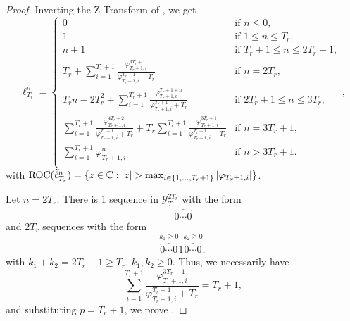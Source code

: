 \documentclass{article}
\begin{document}
  \begin{proof}
    Inverting the Z-Transform of , we get 
    \begin{equation}
      \ell_{T_r}^{n} = 
      \left\{
        \begin{array}{ll}
          0 & \mbox{if } n \leq 0, \\
          1 & \mbox{if } 1 \leq n \leq T_r, \\
          n+1 & \mbox{if } T_r + 1 \leq n \leq 2T_r-1, \\
          T_r + \sum_{i=1}^{T_r + 1} \frac{\varphi_{T_r + 1, i}^{3T_r + 1}}
          {\varphi_{T_r + 1, i}^{T_r + 1} + T_r} & \mbox{if } n = 2T_r, \\
          T_r n - 2T_r ^2 + \sum_{i=1}^{T_r + 1} \frac{\varphi_{T_r + 1, i}^{T_r + 1 + n}}
          {\varphi_{T_r + 1, i}^{T_r + 1} + T_r} & \mbox{if } 2T_r+1 \leq n \leq 3T_r, \\
          \sum_{i=1}^{T_r + 1} \frac{\varphi_{T_r + 1, i}^{4T_r + 2}}
          {\varphi_{T_r + 1, i}^{T_r + 1} + T_r} + T_r \sum_{i=1}^{T_r + 1} \frac{\varphi_{T_r + 1, i}^{3T_r + 1}}
          {\varphi_{T_r + 1, i}^{T_r + 1} + T_r} & \mbox{if } n=3T_r+1, \\
          \sum_{i=1}^{T_r + 1} \varphi_{T_r + 1, i}^n
          & \mbox{if } n > 3T_r + 1. \\
        \end{array}
      \right.,
    \end{equation}
    with $\textnormal{ROC}(\tilde{\ell}_{T_r}^{n}) = \{z \in \mathbb C : |z| > \max_{i \in \{1, \dots, T_r + 1\}} |\varphi_{T_r + 1, i}|\}$.  
  
    Let $n = 2T_r$. There is 1 sequence in $\mathcal{Y}_{T_r}^{2T_r}$ with the form
    \begin{equation*}
      \overbrace{0 \cdots 0}
    \end{equation*} 
    and $2T_r$ sequences with the form
    \begin{equation*}
      \overbrace{0 \cdots 0}^{k_1 \geq 0} 1 \overbrace{0 \cdots 0}^{k_2 \geq 0},
    \end{equation*} 
    with $k_1 + k_2 = 2 T_r - 1 \geq T_r$, $k_1, k_2 \geq 0$.
    Thus, we necessarily have 
    \begin{equation}
      \sum_{i=1}^{T_r + 1} \frac{\varphi_{T_r + 1, i}^{3T_r + 1}}
          {\varphi_{T_r + 1, i}^{T_r + 1} + T_r} = T_r + 1, 
    \end{equation}
    and substituting $p = T_r + 1$, we prove .


\end{proof}
\end{document}
